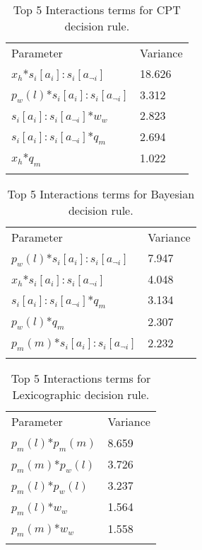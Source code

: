\begin{table}[H]
\caption{Top 5 Interactions terms for \ac{CPT} decision rule. \label{tab:sa_interaction_prospect_group_iqr_iqr}}
\begin{tabular} {ll}
\hline\noalign{\smallskip}
Parameter & Variance \\ 
\noalign{\smallskip}\svhline\noalign{\smallskip}

\(x_{h}\)*\(s_{i}[a_{i}]:s_{i}[a_{\neg i}]\) & 18.626\\
\(p_{w}(l)\)*\(s_{i}[a_{i}]:s_{i}[a_{\neg i}]\) & 3.312\\
\(s_{i}[a_{i}]:s_{i}[a_{\neg i}]\)*\(w_{w}\) & 2.823\\
\(s_{i}[a_{i}]:s_{i}[a_{\neg i}]\)*\(q_{m}\) & 2.694\\
\(x_{h}\)*\(q_{m}\) & 1.022\\
\noalign{\smallskip}\hline\noalign{\smallskip}
\end{tabular}
\end{table}

\begin{table}[H]
\caption{Top 5 Interactions terms for Bayesian decision rule. \label{tab:sa_interaction_sharing_group_iqr_iqr}}
\begin{tabular} {ll}
\hline\noalign{\smallskip}
Parameter & Variance \\
\noalign{\smallskip}\svhline\noalign{\smallskip}
\(p_{w}(l)\)*\(s_{i}[a_{i}]:s_{i}[a_{\neg i}]\) & 7.947\\
\(x_{h}\)*\(s_{i}[a_{i}]:s_{i}[a_{\neg i}]\) & 4.048\\
\(s_{i}[a_{i}]:s_{i}[a_{\neg i}]\)*\(q_{m}\) & 3.134\\
\(p_{w}(l)\)*\(q_{m}\) & 2.307\\
\(p_{m}(m)\)*\(s_{i}[a_{i}]:s_{i}[a_{\neg i}]\) & 2.232\\
\noalign{\smallskip}\hline\noalign{\smallskip}
\end{tabular}
\end{table}

\begin{table}[H]
\caption{Top 5 Interactions terms for Lexicographic decision rule. \label{tab:sa_interaction_lexic_group_iqr_iqr}}
\begin{tabular} {ll}
\hline\noalign{\smallskip}
Parameter & Variance \\
\noalign{\smallskip}\svhline\noalign{\smallskip}
\(p_{m}(l)\)*\(p_{m}(m)\) & 8.659\\
\(p_{m}(m)\)*\(p_{w}(l)\) & 3.726\\
\(p_{m}(l)\)*\(p_{w}(l)\) & 3.237\\
\(p_{m}(l)\)*\(w_{w}\) & 1.564\\
\(p_{m}(m)\)*\(w_{w}\) & 1.558\\
\noalign{\smallskip}\hline\noalign{\smallskip}
\end{tabular}
\end{table}

